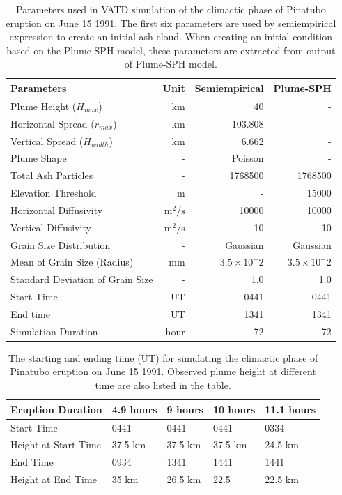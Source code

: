 \documentclass[utf8]{frontiersSCNS} %
\begin{document}
\begin{table}[htp]
\centering
\caption{Parameters used in VATD simulation of the climactic phase of Pinatubo eruption on June 15 1991. The first six parameters are used by semiempirical expression to create an initial ash cloud. When creating an initial condition based on the Plume-SPH model, these parameters are extracted from output of Plume-SPH model.}
	 \begin{tabular}{lrrr}
	 \hline
	 Parameters & Unit & Semiempirical & Plume-SPH \\
	 \hline
	 Plume Height ($H_{max}$) & km & 40 & - \\ 
	 Horizontal Spread ($r_{max}$) & km & 103.808 & -\\
	 Vertical Spread ($H_{width}$) & km & 6.662 & - \\
	 Plume Shape & - & Poisson & - \\
	 Total Ash Particles & - & 1768500 & 1768500 \\
	 Elevation Threshold & m & - & 15000 \\
	 Horizontal Diffusivity & $\mathrm{m}^2/\mathrm{s}$ &10000 & 10000\\
	 Vertical Diffusivity & $\mathrm{m}^2/\mathrm{s}$ & 10 & 10 \\
	 Grain Size Distribution & - & Gaussian & Gaussian \\
	 Mean of Grain Size (Radius) & mm & $3.5 \times 10 ^-2$ & $3.5 \times 10 ^-2$ \\
	 Standard Deviation of Grain Size & - & 1.0 & 1.0 \\
	 	Start Time & UT & 0441 & 0441 \\
	 End time & UT & 1341 & 1341 \\
	 Simulation Duration & hour & 72 & 72 \\
	 \hline
	 \end{tabular}
	 \label{tab:input_parameter_Puff_simulation}
\end{table}

\begin{table}[htp]
\centering
\caption{The starting and ending time (UT) for simulating the climactic phase of Pinatubo eruption on June 15 1991. Observed plume height \citep{holasek1996satellite} at different time are also listed in the table.}		
	 \begin{tabular}{p{35mm}p{20mm}p{20mm}p{20mm}p{20mm}}
	 \hline
Eruption Duration & 4.9 hours & 9 hours & 10 hours & 11.1 hours \\
	 \hline
	 Start Time & 0441 & 0441 & 0441 & 0334 \\
	 Height at Start Time & 37.5 km & 37.5 km & 37.5 km & 24.5 km \\
	
	 End Time & 0934 & 1341 & 1441 & 1441 \\
	 Height at End Time & 35 km & 26.5 km & 22.5 & 22.5 km \\
	 \hline
	 \end{tabular}
	 \label{tab:Pinatubo-eruption-duration}
\end{table}
\end{document}
